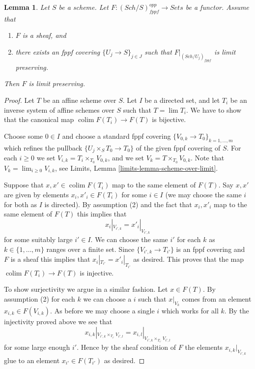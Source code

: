 \documentclass{stacks-project}
\theoremstyle{plain}
\newtheorem{lemma}[subsection]{Lemma}
\theoremstyle{definition}
\theoremstyle{remark}
\numberwithin{equation}{subsection}
\def\lim{\mathop{\mathrm{lim}}\nolimits}
\def\colim{\mathop{\mathrm{colim}}\nolimits}
\def\Sch{\mathit{Sch}}
\begin{document}
\begin{lemma}
\label{lemma-sheaf-finite-presentation}
Let $S$ be a scheme.
Let $F : (\Sch/S)_{fppf}^{opp} \to \textit{Sets}$ be a functor.
Assume that
\begin{enumerate}
\item $F$ is a sheaf, and
\item there exists an fppf covering $\{U_j \to S\}_{j \in J}$ such that
$F|_{(\Sch/U_j)_{fppf}}$ is limit preserving.
\end{enumerate}
Then $F$ is limit preserving.
\end{lemma}

\begin{proof}
Let $T$ be an affine scheme over $S$.
Let $I$ be a directed set, and let
$T_i$ be an inverse system of affine schemes over $S$ such that
$T = \lim T_i$. We have to show that the canonical
map $\colim F(T_i) \to F(T)$ is bijective.

\medskip\noindent
Choose some $0 \in I$ and choose a standard fppf covering
$\{V_{0, k} \to T_{0}\}_{k = 1, \ldots, m}$ which refines
the pullback $\{U_j \times_S T_0 \to T_0\}$ of the given fppf covering of $S$.
For each $i \geq 0$ we set $V_{i, k} = T_i \times_{T_0} V_{0, k}$, and
we set $V_k = T \times_{T_0} V_{0, k}$. Note that
$V_k = \lim_{i \geq 0} V_{i, k}$, see
Limits, Lemma \ref{limits-lemma-scheme-over-limit}.

\medskip\noindent
Suppose that $x, x' \in \colim F(T_i)$ map to the same
element of $F(T)$. Say $x, x'$ are given by elements $x_i, x'_i \in F(T_i)$
for some $i \in I$ (we may choose the same $i$ for both as $I$ is directed).
By assumption (2) and the fact that $x_i, x'_i$ map to the same element
of $F(T)$ this implies that
$$
x_i|_{V_{i', k}} = x'_i|_{V_{i', k}}
$$
for some suitably large $i' \in I$. We can choose the same $i'$ for each
$k$ as $k \in \{1, \ldots, m\}$ ranges over a finite set.
Since $\{V_{i', k} \to T_{i'}\}$
is an fppf covering and $F$ is a sheaf this implies that
$x_i|_{T_{i'}} = x'_i|_{T_{i'}}$ as desired. This proves that the map
$\colim F(T_i) \to F(T)$ is injective.

\medskip\noindent
To show surjectivity we argue in a similar fashion.
Let $x \in F(T)$. By assumption (2) for each $k$ we
can choose a $i$ such that $x|_{V_k}$ comes from an
element $x_{i, k} \in F(V_{i, k})$. As before we may choose a
single $i$ which works for all $k$. By the injectivity
proved above we see that
$$
x_{i, k}|_{V_{i', k} \times_{T_{i'}} V_{i', l}}
=
x_{i, l}|_{V_{i', k} \times_{T_{i'}} V_{i', l}}
$$
for some large enough $i'$. Hence by the sheaf condition of $F$
the elements $x_{i, k}|_{V_{i', k}}$ glue to an element $x_{i'} \in F(T_{i'})$
as desired.
\end{proof}
\end{document}
